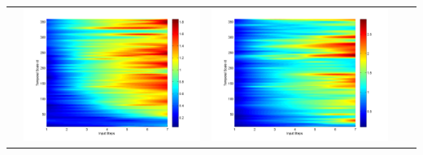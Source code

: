 \documentclass[11pt]{article}
\begin{document}
\begin{table}[H]
{\begin{tabular}{ccccc}
&\begin{minipage}{.3\textwidth}\includegraphics[width=\linewidth]{resultgraph/06810000p.png}\end{minipage}
&\begin{minipage}{.3\textwidth}\includegraphics[width=\linewidth]{resultgraph/06810000pep.png}\end{minipage}

\end{tabular}}
\end{table}
\end{document}
